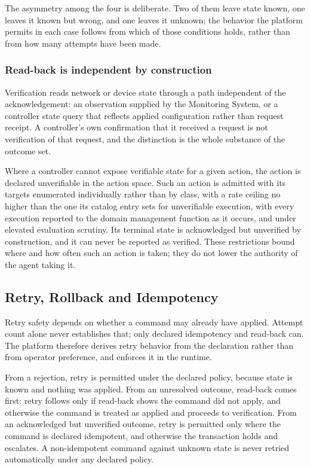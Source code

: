 The asymmetry among the four is deliberate. Two of them leave state
known, one leaves it known but wrong, and one leaves it unknown; the
behavior the platform permits in each case follows from which of those
conditions holds, rather than from how many attempts have been made.

\hypertarget{read-back-is-independent-by-construction}{%
\subsubsection{Read-back is independent by construction}\label{read-back-is-independent-by-construction}}

Verification reads network or device state through a path independent of
the acknowledgement: an observation supplied by the Monitoring System,
or a controller state query that reflects applied configuration rather
than request receipt. A controller's own confirmation that it received a
request is not verification of that request, and the distinction is the
whole substance of the outcome set.

Where a controller cannot expose verifiable state for a given action,
the action is declared unverifiable in the action space. Such an action
is admitted with its targets enumerated individually rather than by
class, with a rate ceiling no higher than the one its catalog entry sets
for unverifiable execution, with every execution reported to the domain
management function as it occurs, and under elevated evaluation
scrutiny. Its terminal state is acknowledged but unverified by
construction, and it can never be reported as verified. These
restrictions bound where and how often such an action is taken; they do
not lower the authority of the agent taking it.

\hypertarget{retry-rollback-and-idempotency}{%
\subsection{Retry, Rollback and Idempotency}\label{retry-rollback-and-idempotency}}

Retry safety depends on whether a command may already have applied.
Attempt count alone never establishes that; only declared idempotency
and read-back can. The platform therefore derives retry behavior from
the declaration rather than from operator preference, and enforces it in
the runtime.

From a rejection, retry is permitted under the declared policy, because
state is known and nothing was applied. From an unresolved outcome,
read-back comes first: retry follows only if read-back shows the command
did not apply, and otherwise the command is treated as applied and
proceeds to verification. From an acknowledged but unverified outcome,
retry is permitted only where the command is declared idempotent, and
otherwise the transaction holds and escalates. A non-idempotent command
against unknown state is never retried automatically under any declared
policy.

